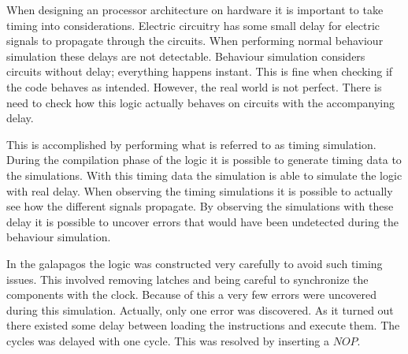 When designing an processor architecture on hardware it is important to take timing into considerations. Electric circuitry has some small delay for electric signals to propagate through the circuits. When performing normal behaviour simulation these delays are not detectable. Behaviour simulation considers circuits without delay; everything happens instant. This is fine when checking if the code behaves as intended. However, the real world is not perfect. There is need to check how this logic actually behaves on circuits with the accompanying delay. 

This is accomplished by performing what is referred to as timing simulation. During the compilation phase of the logic it is possible to generate timing data to the simulations. With this timing data the simulation is able to simulate the logic with real delay. When observing the timing simulations it is possible to actually see how the different signals propagate. By observing the simulations with these delay it is possible to uncover errors that would have been undetected during the behaviour simulation. 

In the galapagos the logic was constructed very carefully to avoid such timing issues. This involved removing latches and being careful to synchronize the components with the clock. Because of this a very few errors were uncovered during this simulation. Actually, only one error was discovered. As it turned out there existed some delay between loading the instructions and execute them. The cycles was delayed with one cycle. This was resolved by inserting a $NOP$.  


